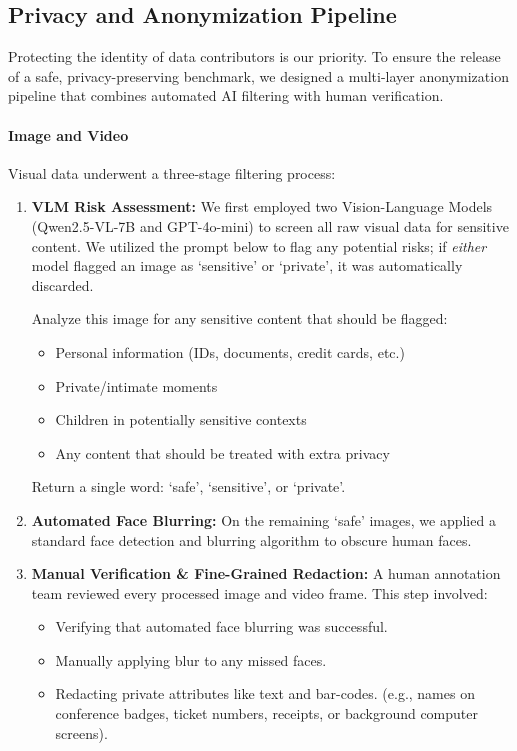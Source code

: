 \documentclass{article}
\theoremstyle{plain}
\theoremstyle{definition}
\theoremstyle{remark}
\begin{document}
\subsection{Privacy and Anonymization Pipeline} 
\label{app:privacyfilter}
Protecting the identity of data contributors is our priority. To ensure the release of a safe, privacy-preserving benchmark, we designed a multi-layer anonymization pipeline that combines automated AI filtering with human verification. 

\paragraph{Image and Video}
Visual data underwent a three-stage filtering process: \begin{enumerate} \item \textbf{VLM Risk Assessment:} We first employed two Vision-Language Models (Qwen2.5-VL-7B and GPT-4o-mini) to screen all raw visual data for sensitive content. We utilized the prompt below to flag any potential risks; if \textit{either} model flagged an image as `sensitive' or `private', it was automatically discarded.
\begin{tcolorbox}[colback=gray!10!white, colframe=black, arc=2mm, title=\small \textbf{VLM Safety Prompt}]
\small
Analyze this image for any sensitive content that should be flagged:
\begin{itemize}
    \item Personal information (IDs, documents, credit cards, etc.)
    \item Private/intimate moments
    \item Children in potentially sensitive contexts
    \item Any content that should be treated with extra privacy
\end{itemize}
Return a single word: `safe', `sensitive', or `private'.
\end{tcolorbox}

\item \textbf{Automated Face Blurring:} On the remaining `safe' images, we applied a standard face detection and blurring algorithm to obscure human faces.

\item \textbf{Manual Verification \& Fine-Grained Redaction:} A human annotation team reviewed every processed image and video frame. This step involved:
\begin{itemize}
    \item Verifying that automated face blurring was successful.
    \item Manually applying blur to any missed faces.
    \item Redacting private attributes like text and bar-codes. (e.g., names on conference badges, ticket numbers, receipts, or background computer screens).
\end{itemize}
\end{enumerate}
\end{document}
